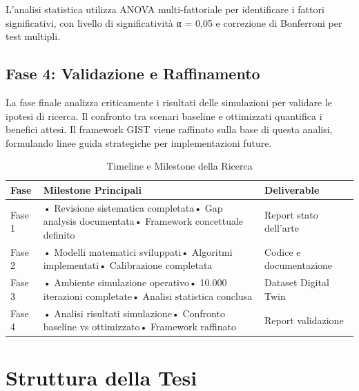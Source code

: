 L'analisi statistica utilizza ANOVA multi-fattoriale per identificare i fattori significativi, con livello di significatività α = 0,05 e correzione di Bonferroni per test multipli.

\subsection{\texorpdfstring{Fase 4: Validazione e Raffinamento}{1.5.5 - Fase 4: Validazione e Raffinamento}}
\label{subsec:fase4}

La fase finale analizza criticamente i risultati delle simulazioni per validare le ipotesi di ricerca. Il confronto tra scenari baseline e ottimizzati quantifica i benefici attesi. Il framework GIST viene raffinato sulla base di questa analisi, formulando linee guida strategiche per implementazioni future.

\begin{table}[htbp]
\centering
\small
\caption{Timeline e Milestone della Ricerca}
\label{tab:timeline_ricerca}
\begin{tabularx}{\textwidth}{@{}lXl@{}}
\toprule
\textbf{Fase} & \textbf{Milestone Principali} & \textbf{Deliverable} \\
\midrule
Fase 1 & • Revisione sistematica completata\newline• Gap analysis documentata\newline• Framework concettuale definito & Report stato dell'arte \\
Fase 2 & • Modelli matematici sviluppati\newline• Algoritmi implementati\newline• Calibrazione completata & Codice e documentazione \\
Fase 3 & • Ambiente simulazione operativo\newline• 10.000 iterazioni completate\newline• Analisi statistica conclusa & Dataset Digital Twin \\
Fase 4 & • Analisi risultati simulazione\newline• Confronto baseline vs ottimizzato\newline• Framework raffinato & Report validazione \\
\bottomrule
\end{tabularx}
\end{table}

\section{\texorpdfstring{Struttura della Tesi}{1.6 - Struttura della Tesi}}
\label{sec:struttura_tesi}

